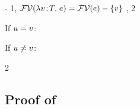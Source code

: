 \begin{bycase}
\begin{derivation}
     {\hyp}
\step{\varI\not\in\efvar{\expr}-\setI{\var}}
     {1, $\mathcal{FV}(\lambda v\!:\!T.\;e)=\mathcal{FV}(e)-\{v\}$}
\step{\cvarvO{\absO}=\emptyset}
     {, 2}
\end{derivation}
\noindent
If $u=v$:
\begin{derivatioN}{3}
\step{\esbsO{(\absO)}=\absO}
     {}
\end{derivatioN}
\noindent
If $u\neq v$:
\begin{derivatioN}{3}
\step{\varI\not\in\efvar{\expr}}
     {2}
\end{derivatioN}
\end{bycase}



\subsection*{Proof of }

